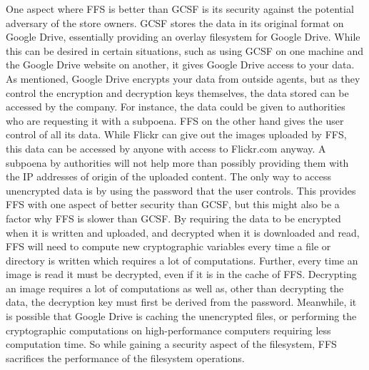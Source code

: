 One aspect where \gls{FFS} is better than \gls{GCSF} is its security against the potential adversary of the store owners. \gls{GCSF} stores the data in its original format on Google Drive, essentially providing an overlay filesystem for Google Drive. While this can be desired in certain situations, such as using \gls{GCSF} on one machine and the Google Drive website on another, it gives Google Drive access to your data. As mentioned, Google Drive encrypts your data from outside agents, but as they control the encryption and decryption keys themselves, the data stored can be accessed by the company. For instance, the data could be given to authorities who are requesting it with a subpoena. \gls{FFS} on the other hand gives the user control of all its data. While Flickr can give out the images uploaded by \gls{FFS}, this data can be accessed by anyone with access to Flickr.com anyway. A subpoena by authorities will not help more than possibly providing them with the IP addresses of origin of the uploaded content. The only way to access unencrypted data is by using the password that the user controls. This provides \gls{FFS} with one aspect of better security than \gls{GCSF}, but this might also be a factor why \gls{FFS} is slower than \gls{GCSF}. By requiring the data to be encrypted when it is written and uploaded, and decrypted when it is downloaded and read, \gls{FFS} will need to compute new cryptographic variables every time a file or directory is written which requires a lot of computations. Further, every time an image is read it must be decrypted, even if it is in the cache of \gls{FFS}. Decrypting an image requires a lot of computations as well as, other than decrypting the data, the decryption key must first be derived from the password. Meanwhile, it is possible that Google Drive is caching the unencrypted files, or performing the cryptographic computations on high-performance computers requiring less computation time. So while gaining a security aspect of the filesystem, \gls{FFS} sacrifices the performance of the filesystem operations.

